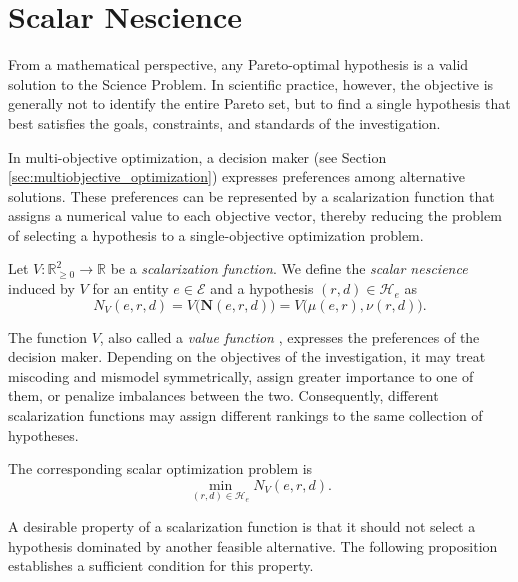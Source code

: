 \section{Scalar Nescience}
\label{sec:scalar_nescience}

From a mathematical perspective, any Pareto-optimal hypothesis is a valid solution to the Science Problem. In scientific practice, however, the objective is generally not to identify the entire Pareto set, but to find a single hypothesis that best satisfies the goals, constraints, and standards of the investigation.

In multi-objective optimization, a decision maker (see Section \ref{sec:multiobjective_optimization}) expresses preferences among alternative solutions. These preferences can be represented by a scalarization function that assigns a numerical value to each objective vector, thereby reducing the problem of selecting a hypothesis to a single-objective optimization problem.

\begin{definition}
Let $V:\mathbb{R}_{\geq 0}^2\to\mathbb{R}$ be a \emph{scalarization function}. We define the \emph{scalar nescience} induced by $V$ for an entity $e\in\mathcal E$ and a hypothesis $(r,d)\in\mathcal H_e$ as
\[
N_V(e,r,d) = V\bigl(\mathbf N(e,r,d)\bigr) = V\bigl(\mu(e,r),\nu(r,d)\bigr).
\]
\end{definition}

The function $V$, also called a \emph{value function} , expresses the preferences of the decision maker. Depending on the objectives of the investigation, it may treat miscoding and mismodel symmetrically, assign greater importance to one of them, or penalize imbalances between the two. Consequently, different scalarization functions may assign different rankings to the same collection of hypotheses.

The corresponding scalar optimization problem is
\[
\min_{(r,d)\in\mathcal H_e} N_V(e,r,d).
\]

A desirable property of a scalarization function is that it should not select a hypothesis dominated by another feasible alternative. The following proposition establishes a sufficient condition for this property.

